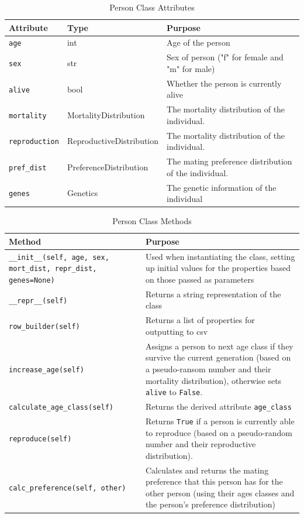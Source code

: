 \documentclass[authoryearcitations]{UoYCSproject}
\begin{document}
\begin{table}[h]
\caption{Person Class Attributes}
\label{tbl:personAttributes}
\begin{tabular}{l l m{5cm}}
\textbf{Attribute} & \textbf{Type} & \textbf{Purpose} \\\hline
\texttt{age} & int & Age of the person \\\hline
\texttt{sex} & str & Sex of person ("f" for female and "m" for male) \\\hline
\texttt{alive} & bool & Whether the person is currently alive \\\hline
\texttt{mortality} & MortalityDistribution & The mortality distribution of the individual. \\\hline
\texttt{reproduction} & ReproductiveDistribution & The mortality distribution of the individual. \\\hline
\texttt{pref\_dist} & PreferenceDistribution & The mating preference distribution of the individual. \\\hline 
\texttt{genes} & Genetics & The genetic information of the individual
\end{tabular}
\end{table}

\begin{landscape}
\begin{table}[h]
\caption{Person Class Methods}
\label{tbl:personMethods}
\begin{tabular}{m{8cm} m{8cm}}
\textbf{Method} & \textbf{Purpose} \\\hline
\texttt{\_\_init\_\_(self, age, sex, mort\_dist, repr\_dist, genes=None)} & Used when instantiating the class, setting up initial values for the properties based on those passed as parameters\\\hline
\texttt{\_\_repr\_\_(self)} & Returns a string representation of the class \\\hline
\texttt{row\_builder(self)} & Returns a list of properties for outputting to csv\\\hline
\texttt{increase\_age(self)} & Assigns a person to next age class if they survive the current generation (based on a pseudo-ransom number and their mortality distribution), otherwise sets \texttt{alive} to \texttt{False}.\\\hline
\texttt{calculate\_age\_class(self)} & Returns the derived attribute \texttt{age\_class} \\\hline
\texttt{reproduce(self)} & Returns \texttt{True} if a person is currently able to reproduce (based on a pseudo-random number and their reproductive distribution). \\\hline
\texttt{calc\_preference(self, other)} & Calculates and returns the mating preference that this person has for the other person (using their ages classes and the person's preference distribution) \\\hline
\end{tabular}
\end{table}
\end{landscape}
\end{document}

